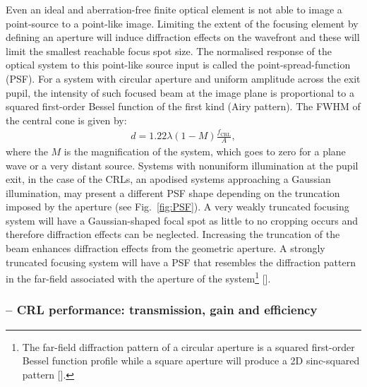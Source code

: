 \begin{refsection}
Even an ideal and aberration-free finite optical element is not able to image a point-source to a point-like image. Limiting the extent of the focusing element by defining an aperture will induce diffraction effects on the wavefront and these will limit the smallest reachable focus spot size. The normalised response of the optical system to this point-like source input is called the point-spread-function (PSF). For a system with circular aperture and uniform amplitude across the exit pupil, the intensity of such focused beam at the image plane is proportional to a squared first-order Bessel function of the first kind (Airy pattern). The FWHM of the central cone is given by:
\begin{align}\label{eq:PSF}
    d = 1.22\lambda (1-M)\frac{f_{\text{CRL}}}{A},
\end{align}{}
where the $M$ is the magnification of the system, which goes to zero for a plane wave or a very distant source. Systems with nonuniform illumination at the pupil exit, in the case of the CRLs, an apodised systems approaching a Gaussian illumination, may present a different PSF shape depending on the truncation imposed by the aperture  (see Fig.~\ref{fig:PSF}). A very weakly truncated focusing system will have a Gaussian-shaped focal spot as little to no cropping occurs and therefore diffraction effects can be neglected. Increasing the truncation of the beam enhances diffraction effects from the geometric aperture. A strongly truncated focusing system will have a PSF that resembles the diffraction pattern in the far-field associated with the aperture of the system\footnote{The far-field diffraction pattern of a circular aperture is a squared first-order Bessel function profile while a square aperture will produce a 2D sinc-squared pattern [\cite{Guasti1993}].} [\cite{Mahajan1986}]. 


\subsubsection*{-- CRL performance: transmission, gain and efficiency}


\end{refsection}

